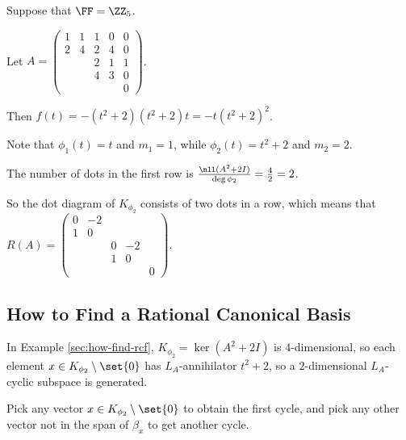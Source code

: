 \documentclass[11pt]{scrartcl}
\begin{document}
\begin{example}
\label{sec:how-find-rcf}
Suppose that $\FF = \ZZ_5$.

Let $A = 
\begin{pmatrix}
1 & 1& 1& 0 &0\\
2& 4 &2 &4 &0\\
& & 2&1 &1\\
& & 4&3 &0\\
& & & &0
\end{pmatrix}
$.

Then $f(t)= -(t^2+2)(t^2+2)t = -t(t^2+2)^2$.

Note that $\phi_1(t)=t$ and $m_1=1$, while $\phi_2(t)=t^2+2$ and $m_2=2$.

The number of dots in the first row is
$\frac{\nll(A^{2}+2I)}{\deg \phi_2} = \frac{4}{2} =2$.

So the dot diagram of $K_{\phi_2}$ consists of two dots in a row, which means that
$R(A) = 
\begin{pmatrix}
0 & -2 & & &\\
1 & 0 & & &\\
& & 0 & -2 &\\
& & 1  & 0 &\\
& & & &0
\end{pmatrix}
$.

\end{example}

\subsection{How to Find a Rational Canonical Basis}

In Example \ref{sec:how-find-rcf}, $K_{\phi_2} = \ker (A^2+2I)$ is
$4$-dimensional, so each element $x\in K_{\phi_2}\setminus \set{0}$
has $L_A$-annihilator $t^2+2$, so a $2$-dimensional $L_A$-cyclic
subspace is generated.

Pick any vector $x\in K_{\phi_2}\setminus \set{0}$ to obtain the first
cycle, and pick any other vector not in the span of $\beta_x$ to get
another cycle.
\end{document}
